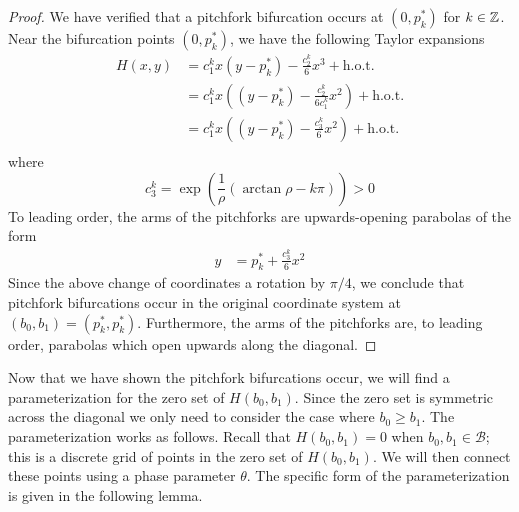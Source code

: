 \documentclass[thesis.tex]{subfiles}
\begin{document}
\begin{lemma}
\begin{proof}
We have verified that a pitchfork bifurcation occurs at $(0, p^*_k)$ for $k \in {\mathbb Z}$. Near the bifurcation points $(0, p_k^*)$, we have the following Taylor expansions
\begin{align*}
H(x, y) &= c_1^k x (y - p_k^*) - \frac{c_2^k}{6} x^3 + \text{h.o.t.} \\
&= c_1^k x \left( (y - p_k^*) - \frac{c_2^k}{6 c_1^k } x^2 \right) + \text{h.o.t.} \\
&= c_1^k x \left( (y - p_k^*) - \frac{c_3^k}{6} x^2 \right) + \text{h.o.t.} \\
\end{align*}
where
\begin{equation*}
c_3^k = \exp{\left(\frac{1}{\rho} (\arctan \rho - k \pi) \right)} > 0
\end{equation*}
To leading order, the arms of the pitchforks are upwards-opening parabolas of the form 
\begin{align*}
y &= p_k^* + \frac{c_3^k}{6} x^2
\end{align*}
Since the above change of coordinates a rotation by $\pi/4$, we conclude that pitchfork bifurcations occur in the original coordinate system at $(b_0, b_1) = (p_k^*, p_k^*)$. Furthermore, the arms of the pitchforks are, to leading order, parabolas which open upwards along the diagonal.
\end{proof}
\end{lemma}

Now that we have shown the pitchfork bifurcations occur, we will find a parameterization for the zero set of $H(b_0, b_1)$. Since the zero set is symmetric across the diagonal we only need to consider the case where $b_0 \geq b_1$. The parameterization works as follows. Recall that $H(b_0, b_1) = 0$ when $b_0, b_1 \in \mathcal{B}$; this is a discrete grid of points in the zero set of $H(b_0, b_1)$. We will then connect these points using a phase parameter $\theta$. The specific form of the parameterization is given in the following lemma.

\end{document}
